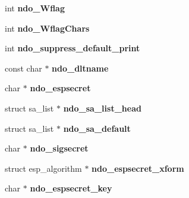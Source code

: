 \begin{DoxyCompactItemize}
\item 
\hypertarget{structnetdissect__options_abd55768b3f32250e51e4e9a49d7239c8}{
int {\bfseries ndo\_\-Wflag}}
\label{structnetdissect__options_abd55768b3f32250e51e4e9a49d7239c8}

\item 
\hypertarget{structnetdissect__options_ac566b478d24427e4f531cbae21675b72}{
int {\bfseries ndo\_\-WflagChars}}
\label{structnetdissect__options_ac566b478d24427e4f531cbae21675b72}

\item 
\hypertarget{structnetdissect__options_a4d86ea7b92fb45664e5e7ab0aae5ca03}{
int {\bfseries ndo\_\-suppress\_\-default\_\-print}}
\label{structnetdissect__options_a4d86ea7b92fb45664e5e7ab0aae5ca03}

\item 
\hypertarget{structnetdissect__options_a4d934738795a2c80636549067dda519b}{
const char $\ast$ {\bfseries ndo\_\-dltname}}
\label{structnetdissect__options_a4d934738795a2c80636549067dda519b}

\item 
\hypertarget{structnetdissect__options_a3896ca7444ea907e8a82d92ab925bf28}{
char $\ast$ {\bfseries ndo\_\-espsecret}}
\label{structnetdissect__options_a3896ca7444ea907e8a82d92ab925bf28}

\item 
\hypertarget{structnetdissect__options_adb79d8f9128b913967d18c9a51b7f28e}{
struct sa\_\-list $\ast$ {\bfseries ndo\_\-sa\_\-list\_\-head}}
\label{structnetdissect__options_adb79d8f9128b913967d18c9a51b7f28e}

\item 
\hypertarget{structnetdissect__options_ae0ac6433e9c88c768bce5468b5e4d5f0}{
struct sa\_\-list $\ast$ {\bfseries ndo\_\-sa\_\-default}}
\label{structnetdissect__options_ae0ac6433e9c88c768bce5468b5e4d5f0}

\item 
\hypertarget{structnetdissect__options_aed831b63f81449d9a9b2109dc5898213}{
char $\ast$ {\bfseries ndo\_\-sigsecret}}
\label{structnetdissect__options_aed831b63f81449d9a9b2109dc5898213}

\item 
\hypertarget{structnetdissect__options_a45c212b1e79754821b479a63f2079a43}{
struct esp\_\-algorithm $\ast$ {\bfseries ndo\_\-espsecret\_\-xform}}
\label{structnetdissect__options_a45c212b1e79754821b479a63f2079a43}

\item 
\hypertarget{structnetdissect__options_a374cbde6724b9dece349a8ca2545e325}{
char $\ast$ {\bfseries ndo\_\-espsecret\_\-key}}
\label{structnetdissect__options_a374cbde6724b9dece349a8ca2545e325}


\end{DoxyCompactItemize}
